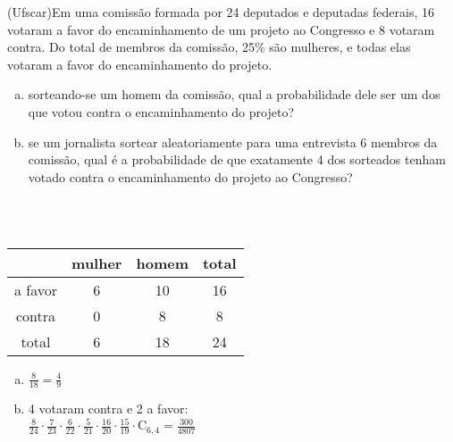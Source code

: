 \begin{ex}
 	(Ufscar)Em uma comissão formada por 24 deputados e deputadas federais, 16 votaram a favor do encaminhamento de um projeto ao Congresso e 8 votaram contra. Do total de membros da comissão, 25\% são mulheres, e todas elas votaram a favor do encaminhamento do projeto.
    \begin{enumerate}[(a)]
    \item sorteando-se um homem da comissão, qual a probabilidade dele ser um dos que votou contra o encaminhamento do projeto?
    \item se um jornalista sortear aleatoriamente para uma entrevista 6 membros da comissão, qual é a probabilidade de que exatamente 4 dos sorteados tenham votado contra o encaminhamento do projeto ao Congresso?
    \end{enumerate}
      \begin{sol}
        \phantom{A}  \\  \\
         \begin{tabular}{c|c|c|c}  \hline
              & mulher & homem & total \\ \hline
            a favor & 6 & 10 & 16  \\  \hline
            contra & 0 & 8 & 8 \\ \hline
            total & 6 & 18 & 24  \\  \hline
         \end{tabular}
            \begin{enumerate}  [(a)]
                \item $\frac{8}{18}=\frac{4}{9}$
                \item 4 votaram contra e 2 a favor: \\
                $\frac{8}{24}\cdot\frac{7}{23}\cdot\frac{6}{22}\cdot\frac{5}{21}\cdot\frac{16}{20}\cdot\frac{15}{19}\cdot\mathrm{C}_{6,4}=\frac{300}{4807}$
            \end{enumerate}
      \end{sol}
\end{ex}